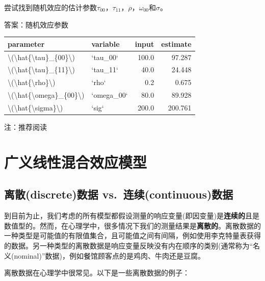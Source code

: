 \documentclass[
]{book}
\begin{document}
尝试找到随机效应的估计参数\(\tau_{00}\)，\(\tau_{11}\)，\(\rho\)，\(\omega_{00}\)和\(\sigma\)。

答案：随机效应参数

\begin{tabular}{l|l|r|r}
\hline
parameter & variable & input & estimate\\
\hline
\textbackslash{}(\textbackslash{}hat\{\textbackslash{}tau\}\_\{00\}\textbackslash{}) & `tau\_00` & 100.0 & 97.287\\
\hline
\textbackslash{}(\textbackslash{}hat\{\textbackslash{}tau\}\_\{11\}\textbackslash{}) & `tau\_11` & 40.0 & 24.448\\
\hline
\textbackslash{}(\textbackslash{}hat\{\textbackslash{}rho\}\textbackslash{}) & `rho` & 0.2 & 0.675\\
\hline
\textbackslash{}(\textbackslash{}hat\{\textbackslash{}omega\}\_\{00\}\textbackslash{}) & `omega\_00` & 80.0 & 89.928\\
\hline
\textbackslash{}(\textbackslash{}hat\{\textbackslash{}sigma\}\textbackslash{}) & `sig` & 200.0 & 200.761\\
\hline
\end{tabular}

注：推荐阅读 \citet{Brown_2021}

\hypertarget{ux5e7fux4e49ux7ebfux6027ux6df7ux5408ux6548ux5e94ux6a21ux578b}{%
\chapter{广义线性混合效应模型}\label{ux5e7fux4e49ux7ebfux6027ux6df7ux5408ux6548ux5e94ux6a21ux578b}}

\hypertarget{ux79bbux6563discreteux6570ux636e-vs.-ux8fdeux7eedcontinuousux6570ux636e}{%
\section{离散(discrete)数据 vs.~连续(continuous)数据}\label{ux79bbux6563discreteux6570ux636e-vs.-ux8fdeux7eedcontinuousux6570ux636e}}

到目前为止，我们考虑的所有模型都假设测量的响应变量(即因变量)是\textbf{连续的}且是数值型的。然而，在心理学中，很多情况下我们的测量结果是\textbf{离散的}。离散数据的一种类型是可能值的有限值集合，且可能值之间有间隔，例如使用李克特量表获得的数据。另一种类型的离散数据是响应变量反映没有内在顺序的类别(通常称为``名义(nominal)''数据)，例如餐馆顾客点的是鸡肉、牛肉还是豆腐。

离散数据在心理学中很常见。以下是一些离散数据的例子：
\end{document}
